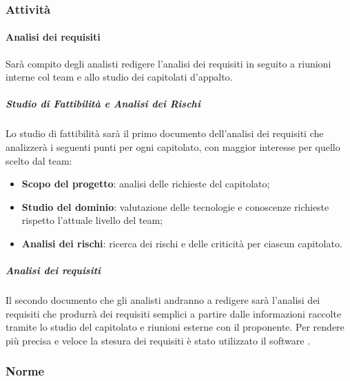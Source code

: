 \subsubsection{Attività}
		\paragraph{Analisi dei requisiti}
		Sarà compito degli analisti redigere l'analisi dei requisiti in seguito a riunioni interne col team e allo studio dei capitolati d'appalto.
			\subparagraph{Studio di Fattibilità e Analisi dei Rischi}
			Lo studio di fattibilità sarà il primo documento dell'analisi dei requisiti che analizzerà i seguenti punti per ogni capitolato, con maggior interesse per quello scelto dal team:
			\begin{itemize}
				\item \textbf{Scopo del progetto}: analisi delle richieste del capitolato;
				\item \textbf{Studio del dominio}: valutazione delle tecnologie e conoscenze richieste rispetto l'attuale livello del team;
				\item \textbf{Analisi dei rischi}: ricerca dei rischi e delle criticità per ciascun capitolato.
			\end{itemize}
			\subparagraph{Analisi dei requisiti}
			Il secondo documento che gli analisti andranno a redigere sarà l'analisi dei requisiti che produrrà dei requisiti semplici a partire dalle informazioni raccolte tramite lo studio del capitolato e riunioni esterne con il proponente.
			Per rendere più precisa e veloce la stesura dei requisiti è stato utilizzato il software .
	\subsubsection{Norme}

